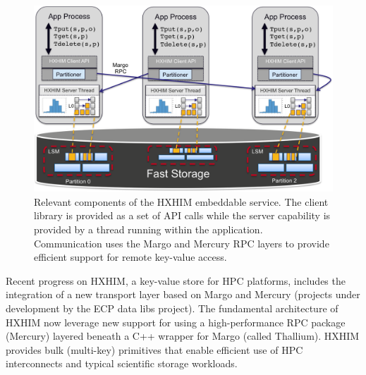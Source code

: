 \begin{figure}[htb]
	\centering
	\includegraphics[width=6in]{projects/2.3.4-DataViz/2.3.4.02-LANL-ATDM-DataViz/hxhim-main}
	\caption{\label{fig:hxhim} Relevant components of the HXHIM
	embeddable service. The client library is provided as a set of API
	calls while the server capability is provided by a thread running
	within the application. Communication uses the Margo and Mercury RPC
	layers to provide efficient support for remote key-value access.}
\end{figure}

Recent progress on HXHIM, a key-value store for HPC platforms, includes the
integration of a new transport layer based on Margo and Mercury (projects
under development by the ECP data libs project). The fundamental architecture
of HXHIM now leverage new support for using a high-performance RPC package
(Mercury) layered beneath a C++ wrapper for Margo (called Thallium). HXHIM
provides bulk (multi-key) primitives that enable efficient use of HPC
interconnects and typical scientific storage workloads.

